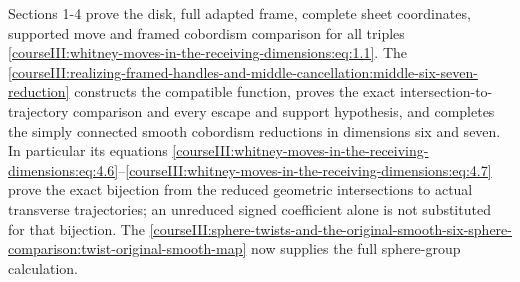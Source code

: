 Sections 1-4 prove the disk, full adapted frame, complete sheet coordinates, supported move and framed cobordism comparison for all triples \eqref{courseIII:whitney-moves-in-the-receiving-dimensions:eq:1.1}. The \cref{courseIII:realizing-framed-handles-and-middle-cancellation:middle-six-seven-reduction} constructs the compatible function, proves the exact intersection-to-trajectory comparison and every escape and support hypothesis, and completes the simply connected smooth cobordism reductions in dimensions six and seven. In particular its equations \eqref{courseIII:whitney-moves-in-the-receiving-dimensions:eq:4.6}--\eqref{courseIII:whitney-moves-in-the-receiving-dimensions:eq:4.7} prove the exact bijection from the reduced geometric intersections to actual transverse trajectories; an unreduced signed coefficient alone is not substituted for that bijection. The \cref{courseIII:sphere-twists-and-the-original-smooth-six-sphere-comparison:twist-original-smooth-map} now supplies the full sphere-group calculation.
